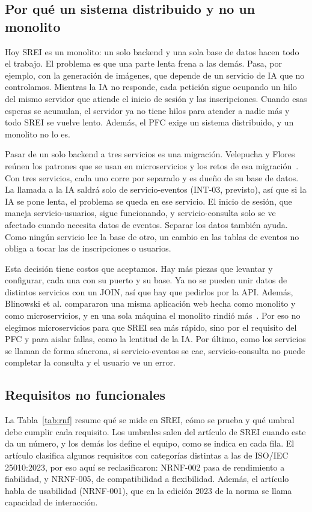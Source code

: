 \subsection{Por qué un sistema distribuido y no un monolito}
Hoy SREI es un monolito: un solo backend y una sola base de datos hacen todo el trabajo. El problema es que una parte lenta frena a las demás. Pasa, por ejemplo, con la generación de imágenes, que depende de un servicio de IA que no controlamos. Mientras la IA no responde, cada petición sigue ocupando un hilo del mismo servidor que atiende el inicio de sesión y las inscripciones. Cuando esas esperas se acumulan, el servidor ya no tiene hilos para atender a nadie más y todo SREI se vuelve lento. Además, el PFC exige un sistema distribuido, y un monolito no lo es.

Pasar de un solo backend a tres servicios es una migración. Velepucha y Flores reúnen los patrones que se usan en microservicios y los retos de esa migración~\cite{velepucha2023}. Con tres servicios, cada uno corre por separado y es dueño de su base de datos. La llamada a la IA saldrá solo de servicio-eventos (\mbox{INT-03}, previsto), así que si la IA se pone lenta, el problema se queda en ese servicio. El inicio de sesión, que maneja servicio-usuarios, sigue funcionando, y servicio-consulta solo se ve afectado cuando necesita datos de eventos. Separar los datos también ayuda. Como ningún servicio lee la base de otro, un cambio en las tablas de eventos no obliga a tocar las de inscripciones o usuarios.

Esta decisión tiene costos que aceptamos. Hay más piezas que levantar y configurar, cada una con su puerto y su base. Ya no se pueden unir datos de distintos servicios con un JOIN, así que hay que pedirlos por la API. Además, Blinowski et al. compararon una misma aplicación web hecha como monolito y como microservicios, y en una sola máquina el monolito rindió más~\cite{blinowski2022}. Por eso no elegimos microservicios para que SREI sea más rápido, sino por el requisito del PFC y para aislar fallas, como la lentitud de la IA. Por último, como los servicios se llaman de forma síncrona, si servicio-eventos se cae, servicio-consulta no puede completar la consulta y el usuario ve un error.

\subsection{Requisitos no funcionales}
La Tabla~\ref{tab:rnf} resume qué se mide en SREI, cómo se prueba y qué umbral debe cumplir cada requisito. Los umbrales salen del artículo de SREI cuando este da un número, y los demás los define el equipo, como se indica en cada fila. El artículo clasifica algunos requisitos con categorías distintas a las de ISO/IEC 25010:2023, por eso aquí se reclasificaron: NRNF-002 pasa de rendimiento a fiabilidad, y NRNF-005, de compatibilidad a flexibilidad. Además, el artículo habla de usabilidad (NRNF-001), que en la edición 2023 de la norma se llama capacidad de interacción.


